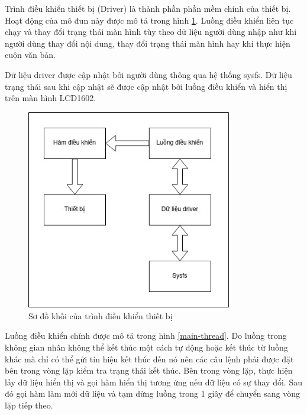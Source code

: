Trình điều khiển thiết bị (Driver) là thành phần phần mềm chính của thiết bị. Hoạt động của mô đun này được mô tả trong hình \ref{driver-block}. Luồng điều khiển liên tục chạy và thay đổi trạng thái màn hình tùy theo dữ liệu người dùng nhập như khi người dùng thay đổi nội dung, thay đổi trạng thái màn hình hay khi thực hiện cuộn văn bản.

Dữ liệu driver được cập nhật bởi người dùng thông qua hệ thống sysfs. Dữ liệu trạng thái sau khi cập nhật sẽ được cập nhật bởi luồng điều khiển và hiển thị trên màn hình LCD1602.

\begin{figure}[H]
	\centering
	\includegraphics[width=0.8\textwidth]{../images/driver.jpg}
	\caption{Sơ đồ khối của trình điều khiển thiết bị}
	\label{driver-block}
\end{figure}

Luồng điều khiển chính được mô tả trong hình \ref{main-thread}. Do luồng trong không gian nhân không thể kết thúc một cách tự động hoặc kết thúc từ luồng khác mà chỉ có thể gửi tín hiệu kết thúc đến nó nên các câu lệnh phải được đặt bên trong vòng lặp kiểm tra trạng thái kết thúc. Bên trong vòng lặp, thực hiện lấy dữ liệu hiển thị và gọi hàm hiển thị tương ứng nếu dữ liệu có sự thay đổi. Sau đó gọi hàm làm mới dữ liệu và tạm dừng luồng trong 1 giây để chuyển sang vòng lặp tiếp theo.


